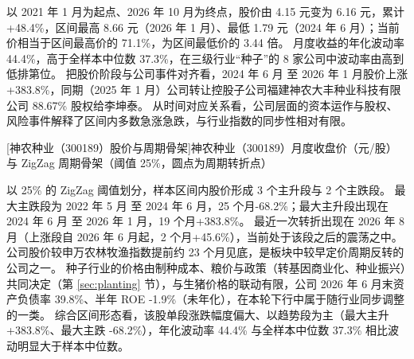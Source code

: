  以 2021 年 1 月为起点、2026 年 10 月为终点，股价由 4.15 元变为 6.16 元，累计 +48.4\%，区间最高 8.66 元（2026 年 1 月）、最低 1.79 元（2024 年 6 月）；当前价相当于区间最高价的 71.1\%，为区间最低价的 3.44 倍。 月度收益的年化波动率 44.4\%，高于全样本中位数 37.3\%，在三级行业“种子”的 8 家公司中波动率由高到低排第位。 把股价阶段与公司事件对齐看，2024 年 6 月 至 2026 年 1 月股价上涨+383.8\%，同期（2025 年 1 月）公司转让控股子公司福建神农大丰种业科技有限公司 88.67\% 股权给李坤泰。 从时间对应关系看，公司层面的资本运作与股权、风险事件解释了区间内多数急涨急跌，与行业指数的同步性相对有限。

\begin{center}
\begin{minipage}{\textwidth}\centering
{}

[神农种业（300189）股价与周期骨架]{神农种业（300189）月度收盘价（元/股）与 ZigZag 周期骨架（阈值 25\%，圆点为周期转折点）}
\end{minipage}
\end{center}

 以 25\% 的 ZigZag 阈值划分，样本区间内股价形成 3 个主升段与 2 个主跌段。 最大主跌段为 2022 年 5 月 至 2024 年 6 月，25 个月-68.2\%；最大主升段出现在 2024 年 6 月 至 2026 年 1 月，19 个月+383.8\%。 最近一次转折出现在 2026 年 8 月（上涨段自 2026 年 6 月起，2 个月+45.6\%），当前处于该段之后的震荡之中。 公司股价较申万农林牧渔指数提前约 23 个月见底，是板块中较早定价周期反转的公司之一。 种子行业的价格由制种成本、粮价与政策（转基因商业化、种业振兴）共同决定（第 \ref{sec:planting} 节），与生猪价格的联动有限，公司 2026 年 6 月末资产负债率 39.8\%、半年 ROE -1.9\%（未年化），在本轮下行中属于随行业同步调整的一类。 综合区间形态看，该股单段涨跌幅度偏大、以趋势段为主（最大主升 +383.8\%、最大主跌 -68.2\%），年化波动率 44.4\% 与全样本中位数 37.3\% 相比波动明显大于样本中位数。

